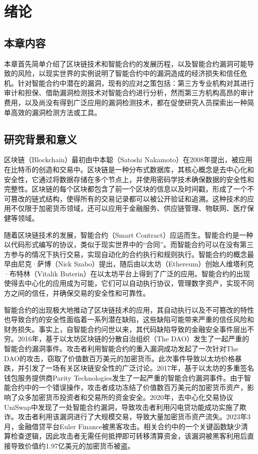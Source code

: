\chapter{绪论}
\section{本章内容}
本章首先简单介绍了区块链技术和智能合约的发展历程，以及智能合约漏洞可能导致的风险，以现实世界的实例说明了智能合约中的漏洞造成的经济损失和信任危机。针对智能合约中潜在的漏洞，现有的应对之策包括：第三方专业机构对其进行审计和担保、借助漏洞检测技术对智能合约进行分析，然而第三方机构高昂的审计费用，以及尚没有得到广泛应用的漏洞检测技术，都在促使研究人员探索出一种简单高效的漏洞检测方法或工具。


\section{研究背景和意义}

区块链（Blockchain）最初由中本聪（Satoshi Nakamoto）在2008年提出\cite{nakamoto2008bitcoin}，被应用在比特币的创造和交易中。区块链是一种分布式数据库，其核心概念是去中心化和安全性，它通过将数据存储在多个节点上，并使用密码学技术确保数据的安全性和完整性。区块链的每个区块都包含了前一个区块的信息以及时间戳，形成了一个不可篡改的链式结构，使得所有的交易记录都可以被公开验证和追溯。这种技术的应用不仅限于加密货币领域，还可以应用于金融服务、供应链管理、物联网、医疗保健等领域。

随着区块链技术的发展，智能合约（Smart Contract）应运而生。智能合约是一种以代码形式编写的协议，类似于现实世界中的“合同”。而智能合约可以在没有第三方参与的情况下执行交易，实现自动化的合约执行和规则执行。智能合约的概念最早由尼克·萨博（Nick Szabo）提出，随后由以太坊（Ethereum）创始人维塔利克·布特林（Vitalik Buterin）在以太坊平台上得到了广泛的应用。智能合约的出现使得去中心化的应用成为可能，它们可以自动执行协议，管理数字资产，实现不同方之间的信任，并确保交易的安全性和可靠性。

智能合约的出现极大地推动了区块链技术的应用，其自动执行以及不可篡改的特性也导致合约的安全性面临着一系列潜在缺陷，这些缺陷可能带来严重的信任风险和财务损失。事实上，自智能合约问世以来，其代码缺陷导致的金融安全事件层出不穷。2016年，基于以太坊区块链的分散自治组织（The DAO）发生了一起严重的智能合约漏洞事件。攻击者利用智能合约的重入漏洞成功发起了一次针对The DAO的攻击，窃取了价值数百万美元的加密货币。此次事件导致以太坊价格暴跌，并引发了一场有关区块链安全性的广泛讨论。2017年，基于以太坊的多重签名钱包服务提供商Parity Technologies发生了一起严重的智能合约漏洞事件。由于智能合约中的一个错误操作，攻击者成功冻结了价值数百万美元的加密货币资产，影响了众多加密货币投资者和交易所的资金安全。2020年，去中心化交易协议UniSwap中发现了一处智能合约漏洞，导致攻击者利用闪电贷功能成功实施了欺诈。攻击者利用该漏洞进行了大规模交易，导致大量加密货币资产流失。2023年3月，金融借贷平台Euler Finance被黑客攻击。相关合约中的一个关键函数缺少清算检查逻辑，因此攻击者无需任何抵押即可转移清算资金，该漏洞被黑客利用后直接导致价值约1.97亿美元的加密货币被盗。


